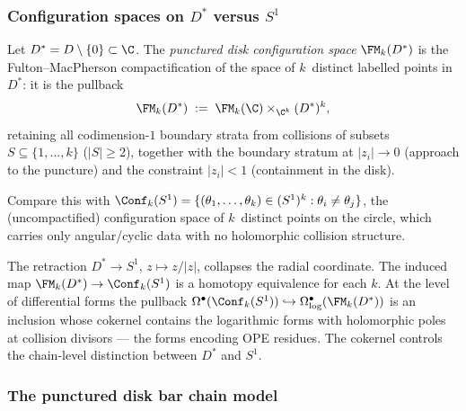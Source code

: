 \subsubsection{\texorpdfstring{Configuration spaces on $D^*$ versus $S^1$}{Configuration spaces on punctured D versus S1}}

\begin{definition}%
\label{def:punctured-disk-config}%
%
%
Let $D^*=D\setminus\{0\}\subset\C$.
The \emph{punctured disk configuration space}
$\FM_k(D^*)$ is the Fulton--MacPherson
compactification of the space of $k$~distinct
labelled points in~$D^*$: it is the pullback
\[
\FM_k(D^*)
\;:=\;
\FM_k(\C)\times_{\C^k}(D^*)^k,
\]
retaining all codimension-$1$ boundary strata from
collisions of subsets $S\subseteq\{1,\ldots,k\}$
($|S|\ge 2$), together with the boundary stratum
at $|z_i|\to 0$ (approach to the puncture) and
the constraint $|z_i|<1$ (containment in the disk).

Compare this with
$\Conf_k(S^1)=\{(\theta_1,\ldots,\theta_k)\in
(S^1)^k:\theta_i\neq\theta_j\}$,
the (uncompactified) configuration space of $k$~distinct
points on the circle, which carries only angular/cyclic
data with no holomorphic collision structure.
\end{definition}

The retraction $D^*\to S^1$, $z\mapsto z/|z|$, collapses the
radial coordinate. The induced map
$\FM_k(D^*)\to\Conf_k(S^1)$ is a homotopy equivalence for
each $k$. At the level of differential forms the pullback
$\Omega^\bullet(\Conf_k(S^1))\hookrightarrow
\Omega^\bullet_{\log}(\FM_k(D^*))$ is an inclusion whose
cokernel contains the logarithmic forms with holomorphic poles
at collision divisors — the forms encoding OPE
residues. The cokernel controls the chain-level distinction between $D^*$ and $S^1$.

\subsubsection{The punctured disk bar chain model}


